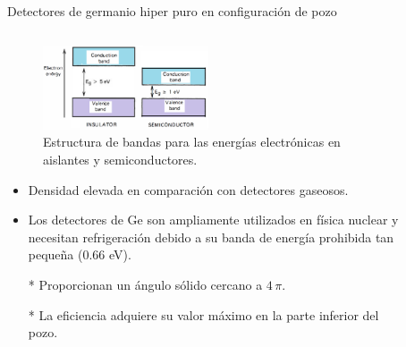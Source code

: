 \documentclass[9pt]{beamer}
\begin{document}
\begin{frame}{Detectores de germanio hiper puro en configuración de pozo}
	\begin{columns}
		\begin{column}{0.68\textwidth}  
\begin{figure}
\includegraphics[width=0.5\textwidth]{Imagenes/SemiConductor.png}
\caption{Estructura de bandas para las energías electrónicas en aislantes y semiconductores\footnotemark[1].}
\end{figure}
			\begin{itemize}
			\justifying		
\item Densidad elevada en comparación con detectores gaseosos. 
\item Los detectores de Ge son ampliamente utilizados en física nuclear y necesitan refrigeración debido a su banda de energía prohibida tan pequeña (0.66 eV). 
\item[*] Proporcionan un ángulo sólido cercano a $4\,\pi$.
\item[*] La eficiencia adquiere su valor máximo en la parte inferior del pozo.
			\end{itemize}
		\end{column}
		\begin{column}{0.28\textwidth}
			\begin{figure}
			\centering

\end{figure}
\end{column}
\end{columns}
\end{frame}
\end{document}
